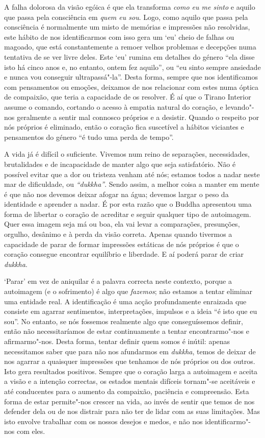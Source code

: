 A falha dolorosa da visão egóica é que ela transforma \emph{como eu me
sinto} e aquilo que passa pela consciência em \emph{quem eu sou}. Logo,
como aquilo que passa pela consciência é normalmente um misto de
memórias e impressões não resolvidas, este hábito de nos identificarmos
com isso gera um `eu' cheio de falhas ou magoado, que está
constantemente a remoer velhos problemas e decepções numa tentativa de
se ver livre deles. Este `eu' rumina em detalhes do género “ela disse
isto há cinco anos e, no entanto, ontem fez aquilo”, ou “eu sinto sempre
ansiedade e nunca vou conseguir ultrapassá"-la”. Desta forma, sempre que
nos identificamos com pensamentos ou emoções, deixamos de nos relacionar
com estes numa óptica de compaixão, que teria a capacidade de os
resolver. É aí que o Tirano Interior assume o comando, cortando o acesso
à empatia natural do coração, e levando"-nos geralmente a sentir mal
connosco próprios e a desistir. Quando o respeito por nós próprios é
eliminado, então o coração fica suscetível a hábitos viciantes e
pensamentos do género “é tudo uma perda de tempo”.

A vida já é difícil o suficiente. Vivemos num reino de separações,
necessidades, brutalidades e de incapacidade de manter algo que seja
satisfatório. Não é possível evitar que a dor ou tristeza venham até
nós; estamos todos a nadar neste mar de dificuldade, ou \emph{“dukkha”}.
Sendo assim, a melhor coisa a manter em mente é que não nos devemos
deixar afogar na água; devemos largar o peso da identidade e aprender a
nadar. É por esta razão que o Buddha apresentou uma forma de libertar o
coração de acreditar e seguir qualquer tipo de autoimagem. Quer essa
imagem seja má ou boa, ela vai levar a comparações, presunções, orgulho,
desânimo e à perda da visão correta. Apenas quando tivermos a capacidade
de parar de formar impressões estáticas de nós próprios é que o coração
consegue encontrar equilíbrio e liberdade. E aí poderá parar de criar
\emph{dukkha}.

`Parar' em vez de aniquilar é a palavra correcta neste contexto, porque
a autoimagem (e o sofrimento) é algo que \emph{fazemos}; não estamos a
tentar eliminar uma entidade real. A identificação é uma acção
profundamente enraizada que consiste em agarrar sentimentos,
interpretações, impulsos e a ideia “é isto que eu sou”. No entanto, se
nós fossemos realmente algo que conseguíssemos definir, então não
necessitaríamos de estar continuamente a tentar encontrarmo"-nos e
afirmarmo"-nos. Desta forma, tentar definir quem somos é inútil: apenas
necessitamos saber que para não nos afundarmos em \emph{dukkha}, temos
de deixar de nos agarrar a quaisquer impressões que tenhamos de nós
próprios ou dos outros. Isto gera resultados positivos. Sempre que o
coração larga a autoimagem e aceita a visão e a intenção correctas, os
estados mentais difíceis tornam"-se aceitáveis e até conducentes para o
aumento da compaixão, paciência e compreensão. Esta forma de estar
permite"-nos crescer na vida, ao invés de sentir que temos de nos
defender dela ou de nos distrair para não ter de lidar com as suas
limitações. Mas isto envolve trabalhar com os nossos desejos e medos, e
não nos identificarmo"-nos com eles.

